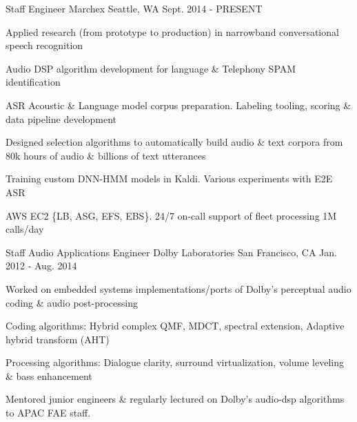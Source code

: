 

\begin{cventries}

  \cventry
    {Staff Engineer} %
    {Marchex} %
    {Seattle, WA} %
    {Sept. 2014 - PRESENT} %
    {
      \begin{cvitems} %
        \item {Applied research (from prototype to production) in narrowband conversational speech recognition}
        \item {Audio DSP algorithm development for language \& Telephony SPAM identification}
        \item {ASR Acoustic \& Language model corpus preparation. Labeling tooling, scoring \& data pipeline development}
        \item {Designed selection algorithms to automatically build audio \& text corpora from 80k hours of audio \& billions of text utterances}
        \item {Training custom DNN-HMM models in Kaldi. Various experiments with E2E ASR}
        \item {AWS EC2 \{LB, ASG, EFS, EBS\}. 24/7 on-call support of fleet processing 1M calls/day}
      \end{cvitems}
    }

  \cventry
    {Staff Audio Applications Engineer} %
    {Dolby Laboratories} %
    {San Francisco, CA} %
    {Jan. 2012 - Aug. 2014} %
    {
      \begin{cvitems} %
        \item {Worked on embedded systems implementations/ports of Dolby's perceptual audio coding \& audio post-processing}
        \item {Coding algorithms: Hybrid complex QMF, MDCT, spectral extension, Adaptive hybrid transform (AHT)}
        \item {Processing algorithms: Dialogue clarity, surround virtualization, volume leveling \& bass enhancement}
        \item {Mentored junior engineers \& regularly lectured on Dolby's audio-dsp algorithms to APAC FAE staff.}
      \end{cvitems}
    }


\end{cventries}
